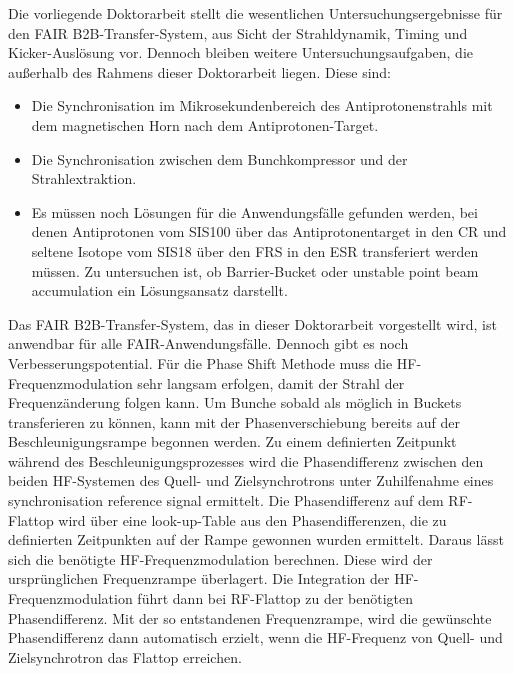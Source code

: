 Die vorliegende Doktorarbeit stellt die wesentlichen Untersuchungsergebnisse f\"ur den FAIR B2B-Transfer-System, aus Sicht der Strahldynamik, Timing und Kicker-Ausl\"osung vor. Dennoch bleiben weitere Untersuchungsaufgaben, die au\ss{}erhalb des Rahmens dieser Doktorarbeit liegen. Diese sind:
\begin{itemize}

\item Die Synchronisation im Mikrosekundenbereich des Antiprotonenstrahls mit dem magnetischen Horn nach dem Antiprotonen-Target.
\item Die Synchronisation zwischen dem Bunchkompressor und der Strahlextraktion.
\item Es m\"ussen noch L\"osungen f\"ur die Anwendungsf\"alle gefunden werden, bei denen Antiprotonen vom SIS100 \"uber das Antiprotonentarget in den CR und seltene Isotope vom SIS18 \"uber den FRS in den ESR transferiert werden m\"ussen. Zu untersuchen ist, ob Barrier-Bucket oder unstable point beam accumulation ein L\"osungsansatz darstellt. 
\end{itemize}

Das FAIR B2B-Transfer-System, das in dieser Doktorarbeit vorgestellt wird, ist anwendbar f\"ur alle FAIR-Anwendungsf\"alle. Dennoch gibt es noch Verbesserungspotential. F\"ur die Phase Shift Methode muss die HF-Frequenzmodulation sehr langsam erfolgen, damit der Strahl der Frequenz\"anderung folgen kann. Um Bunche sobald als m\"oglich in Buckets transferieren zu k\"onnen, kann mit der Phasenverschiebung bereits auf der Beschleunigungsrampe begonnen werden. Zu einem definierten Zeitpunkt w\"ahrend des Beschleunigungsprozesses wird die Phasendifferenz zwischen den beiden HF-Systemen des Quell- und Zielsynchrotrons unter Zuhilfenahme eines synchronisation reference signal ermittelt. Die Phasendifferenz auf dem RF-Flattop wird \"uber eine look-up-Table aus den
Phasendifferenzen, die zu definierten Zeitpunkten auf der Rampe gewonnen wurden ermittelt. Daraus l\"asst sich die ben\"otigte HF-Frequenzmodulation berechnen. Diese wird der urspr\"unglichen Frequenzrampe \"uberlagert. Die Integration der HF-Frequenzmodulation f\"uhrt dann bei RF-Flattop zu der ben\"otigten Phasendifferenz. Mit der so entstandenen Frequenzrampe, wird die gew\"unschte Phasendifferenz dann automatisch erzielt, wenn die HF-Frequenz von Quell- und Zielsynchrotron das Flattop erreichen.